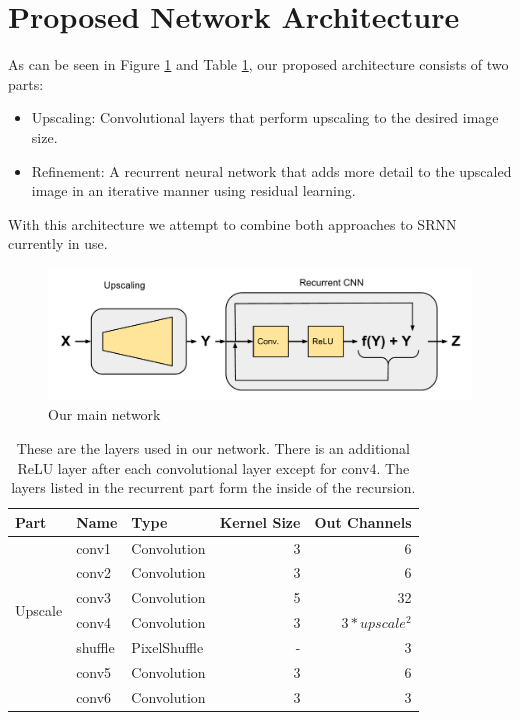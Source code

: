 \documentclass[11pt]{article}
\begin{document}
\newpage
\section{Proposed Network Architecture}

As can be seen in Figure \ref{label:mainNetworkGraph} and Table \ref{table:main_architecture}, our proposed architecture consists of two parts:
\begin{itemize}
	\item 	Upscaling: Convolutional layers that perform upscaling to the desired image size. 
	\item 	Refinement: A recurrent neural network that adds more detail to the upscaled image in an iterative manner using residual learning.
			
\end{itemize}
With this architecture we attempt to combine both approaches to SRNN currently in use.

\begin{figure}[t]
\includegraphics[width=\textwidth]{imgs/MainNet.pdf}
\caption{Our main network}
\label{label:mainNetworkGraph}
\end{figure}
\begin{table}[h!]
    \renewcommand{\arraystretch}{1.5}
    \centering
    \begin{tabular}{ |l|l|l|r|r| }
        \hline
        \textbf{Part} & \textbf{Name} & \textbf{Type} & \textbf{Kernel Size} & \textbf{Out Channels} \\
        \hline
        \multirow{6}{*}{Upscale} & conv1 & Convolution & 3 & 6 \\
        \cline{2-5}
        & conv2 & Convolution & 3 & 6 \\
        \cline{2-5}
        & conv3 & Convolution & 5 & 32 \\
        \cline{2-5}
        & conv4 & Convolution & 3 & $3*upscale^2$ \\
        \cline{2-5}
        & shuffle & PixelShuffle & - & 3\\
        \hline
        \multirow{2}{*}{Recurrent} & conv5 & Convolution & 3 & 6 \\
        \cline{2-5}
        & conv6 & Convolution & 3 & 3 \\
        \hline
    \end{tabular}
    \caption{These are the layers used in our network. There is an additional ReLU layer after each convolutional layer except for conv4. The layers listed in the recurrent part form the inside of the recursion.}
    \label{table:main_architecture}
\end{table}
\end{document}
